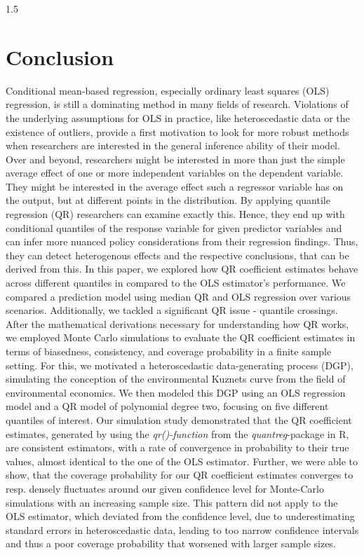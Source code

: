 \documentclass[conference]{IEEEtran}
\begin{document}
\begin{spacing}{1.5}
\section{\textbf{Conclusion}}
Conditional mean-based regression, especially ordinary least squares (OLS) regression, is still a dominating method in many fields of research. Violations of the underlying assumptions for OLS in practice, like heteroscedastic data or the existence of outliers, provide a first motivation to look for more robust methods when researchers are interested in the general inference ability of their model. Over and beyond, researchers might be interested in more than just the simple average effect of one or more independent variables on the dependent variable. They might be interested in the average effect such a regressor variable has on the output, but at different points in the distribution. By applying quantile regression (QR) researchers can examine exactly this. Hence, they end up with conditional quantiles of the response variable for given predictor variables and can infer more nuanced policy considerations from their regression findings. Thus, they can detect heterogenous effects and the respective conclusions, that can be derived from this.
In this paper, we explored how QR coefficient estimates behave across different quantiles in compared to the  OLS estimator's performance. We compared a prediction model using median QR and OLS regression over various scenarios. Additionally, we tackled a significant QR issue - quantile crossings.
After the mathematical derivations necessary for understanding how QR works, we employed Monte Carlo simulations to evaluate the QR coefficient estimates in terms of biasedness, consistency, and coverage probability in a finite sample setting.
For this, we motivated a heteroscedastic data-generating process (DGP), simulating the conception of the environmental Kuznets curve from the field of environmental economics. We then modeled this DGP using an OLS regression model and a QR model of polynomial degree two, focusing on five different quantiles of interest.
Our simulation study demonstrated that the QR coefficient estimates, generated by using the \textit{qr()-function} from the \textit{quantreg}-package in R, are consistent estimators, with a rate of convergence in probability to their true values, almost identical to the one of the OLS estimator. Further, we were able to show, that the coverage probability for our QR coefficient estimates converges to resp. densely fluctuates around our given confidence level for Monte-Carlo simulations with an increasing sample size. This pattern did not apply to the OLS estimator, which deviated from the confidence level, due to underestimating standard errors in heteroscedastic data, leading to too narrow confidence intervals and thus a poor coverage probability that worsened with larger sample sizes. 

\end{spacing}
\end{document}
